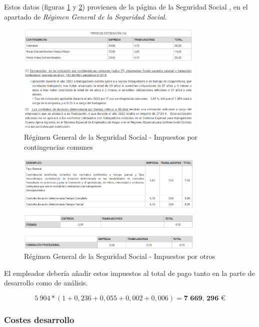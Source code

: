 Estos datos (figuras \ref{fig:segsocial_contin} y \ref{fig:segsocial_otros}) provienen de la página de la Seguridad Social \cite{seguridad:social}, en el apartado de \textit{Régimen General de la Seguridad Social}.

\begin{figure}[h!] 
\centering
    \includegraphics[width=0.8\textwidth]{img/seguridadsocial_1.PNG}
\caption{Régimen General de la Seguridad Social - Impuestos por contingencias comunes}
\label{fig:segsocial_contin}
\end{figure}

\begin{figure}[h!] 
\centering
    \includegraphics[width=0.8\textwidth]{img/seguridadsocial_2.PNG}
\caption{Régimen General de la Seguridad Social - Impuestos por otros}
\label{fig:segsocial_otros}
\end{figure}

El empleador debería añadir estos impuestos al total de pago tanto en la parte de desarrollo como de análisis.

$$ 5\:904 * (1 + 0,236 + 0,055 + 0,002 + 0,006) = \textbf{7 669, 296 €} $$


\subsubsection{Costes desarrollo}

